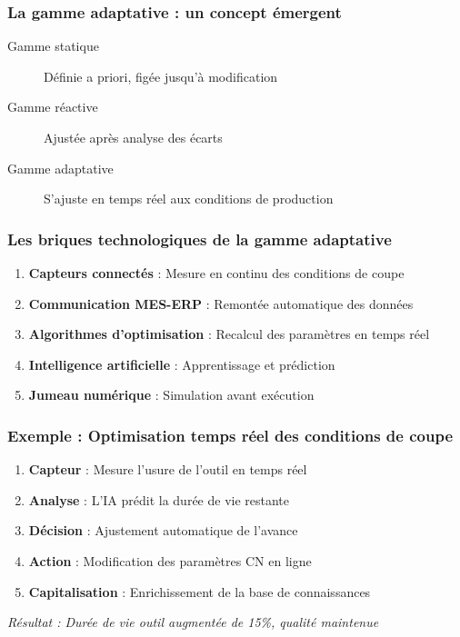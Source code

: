 \documentclass{article}
\begin{document}
\begin{table}[h]
\subsubsection{La gamme adaptative : un concept émergent}

\begin{tcolorbox}[colback=orangeclair, colframe=orange!70!black, title=Vers la gamme 4.0]
\begin{description}
    \item[Gamme statique] Définie a priori, figée jusqu'à modification
    \item[Gamme réactive] Ajustée après analyse des écarts
    \item[Gamme adaptative] S'ajuste en temps réel aux conditions de production
\end{description}
\end{tcolorbox}

\subsubsection{Les briques technologiques de la gamme adaptative}

\begin{enumerate}
    \item \textbf{Capteurs connectés} : Mesure en continu des conditions de coupe
    \item \textbf{Communication MES-ERP} : Remontée automatique des données
    \item \textbf{Algorithmes d'optimisation} : Recalcul des paramètres en temps réel
    \item \textbf{Intelligence artificielle} : Apprentissage et prédiction
    \item \textbf{Jumeau numérique} : Simulation avant exécution
\end{enumerate}

\subsubsection{Exemple : Optimisation temps réel des conditions de coupe}

\begin{tcolorbox}[colback=blueclair, colframe=blue!70!black, title=Scénario d'optimisation adaptative]
\begin{enumerate}
    \item \textbf{Capteur} : Mesure l'usure de l'outil en temps réel
    \item \textbf{Analyse} : L'IA prédit la durée de vie restante
    \item \textbf{Décision} : Ajustement automatique de l'avance
    \item \textbf{Action} : Modification des paramètres CN en ligne
    \item \textbf{Capitalisation} : Enrichissement de la base de connaissances
\end{enumerate}
\textit{Résultat : Durée de vie outil augmentée de 15\%, qualité maintenue}
\end{tcolorbox}


\end{table}
\end{document}
